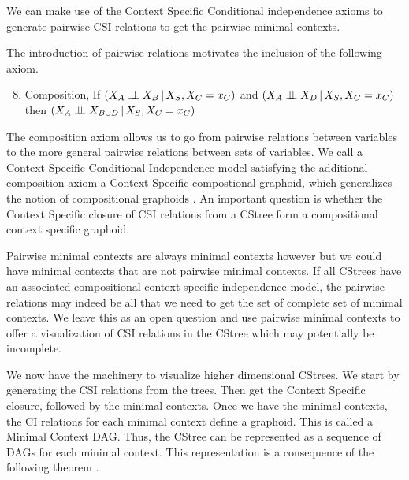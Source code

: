 \documentclass{tufte-book}
\begin{document}
\begin{Definition}
We can make use of the Context Specific Conditional independence axioms to generate pairwise CSI relations to get the pairwise minimal contexts.


The introduction of pairwise relations motivates the inclusion of the following axiom.
\begin{enumerate}
\setcounter{enumi}{7}
\item Composition, If \((X_A \perp \!\!\! \perp X_B \,|\, X_S, X_C=x_C)\) and \((X_A \perp \!\!\! \perp X_D \,|\,X_S,X_C=x_C)\) then \((X_A \perp \!\!\! \perp X_{B\cup D} \,|\,X_S,X_C=x_C)\)
\end{enumerate}


The composition axiom allows us to go from pairwise relations between variables to the more general pairwise relations between sets of variables. We call a Context Specific Conditional Independence model satisfying the additional composition axiom a Context Specific compostional graphoid, which generalizes the notion of compositional graphoids \cite{sadeghi-2014-markov-proper}. An important question is whether the Context Specific closure of CSI relations from a CStree form a compositional context specific graphoid.


Pairwise minimal contexts are always minimal contexts however but we could have minimal contexts that are not pairwise minimal contexts. If all CStrees have an associated compositional context specific independence model, the pairwise relations may indeed be all that we need to get the set of complete set of minimal contexts. We leave this as an open question and use pairwise minimal contexts to offer a visualization of CSI relations in the CStree which may potentially be incomplete.



We now have the machinery to visualize higher dimensional CStrees. We start by generating the CSI relations from the trees. Then get the Context Specific closure, followed by the minimal contexts. Once we have the minimal contexts, the CI relations for each minimal context define a graphoid. This is called a Minimal Context DAG. Thus, the CStree can be represented as a sequence of DAGs for each minimal context. This representation is a consequence of the following theorem \cite{duarte-2021-repres-learn}.




\end{Definition}
\end{document}
